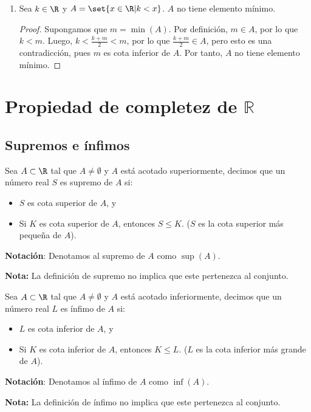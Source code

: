 \begin{enumerate}[label=\alph*)]
  \item Sea $k\in \R$ y $A=\set{x\in \R|k<x}$. $A$ no tiene elemento mínimo.
  
  \begin{proof}
    Supongamos que $m=\min(A)$. Por definición, $m\in A$, por lo que $k<m$. Luego, $k<\frac{k+m}{2}<m$, por lo que $\frac{k+m}{2}\in A$, pero esto es una contradicción, pues $m$ es cota inferior de $A$. Por tanto, $A$ no tiene elemento mínimo.
  \end{proof}
  
\end{enumerate}

\section*{Propiedad de completez de \(\mathbb{R}\)}

\subsection*{Supremos e ínfimos}

 Sea $A\subset \R$ tal que $A\neq \emptyset$ y $A$ está acotado superiormente, decimos que un número real $S$ es supremo de $A$ si:
\begin{itemize}
 \item $S$ es cota superior de $A$, y
 \item Si $K$ es cota superior de $A$, entonces $S\leq K$. ($S$ es la cota superior más pequeña de $A$).
\end{itemize}

\textbf{Notación}: Denotamos al supremo de $A$ como $\sup(A)$.

\textbf{Nota:} La definición de supremo no implica que este pertenezca al conjunto.

 Sea $A\subset \R$ tal que $A\neq \emptyset$ y $A$ está acotado inferiormente, decimos que un número real $L$ es ínfimo de $A$ si: \begin{itemize}
 \item $L$ es cota inferior de $A$, y
 \item Si $K$ es cota inferior de $A$, entonces $K\leq L$. ($L$ es la cota inferior más grande de $A$).
\end{itemize}

\textbf{Notación}: Denotamos al ínfimo de $A$ como $\inf(A)$.

\textbf{Nota:} La definición de ínfimo no implica que este pertenezca al conjunto.

